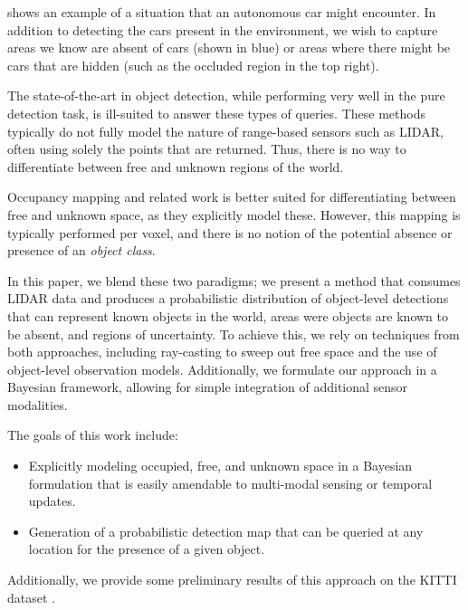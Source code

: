  shows an example of a situation that an autonomous car might
encounter. In addition to detecting the cars present in the environment, we
wish to capture areas we know are absent of cars (shown in blue) or areas where
there might be cars that are hidden (such as the occluded region in the top
right).

The state-of-the-art in object detection, while performing very well in the pure
detection task, is ill-suited to answer these types of queries. These methods
typically do not fully model the nature of range-based sensors such as
\ac{LIDAR}, often using solely the points that are returned. Thus, there is no
way to differentiate between free and unknown regions of the world.

Occupancy mapping and related work is better suited for differentiating between
free and unknown space, as they explicitly model these. However, this mapping is
typically performed per voxel, and there is no notion of the potential absence
or presence of an \emph{object class}.

In this paper, we blend these two paradigms; we present a method that
consumes \ac{LIDAR} data and produces a probabilistic distribution of object-level
detections that can represent known objects in the world, areas were objects are
known to be absent, and regions of uncertainty. To achieve this, we rely on
techniques from both approaches, including ray-casting to sweep out free space
and the use of object-level observation models. Additionally, we formulate our
approach in a Bayesian framework, allowing for simple integration of additional
sensor modalities.

The goals of this work include:
%
\begin{itemize}
  \item Explicitly modeling occupied, free, and unknown space in a Bayesian
    formulation that is easily amendable to multi-modal sensing or temporal
    updates.
  \item Generation of a probabilistic detection map that can be queried at any
    location for the presence of a given object.
\end{itemize}
%
Additionally, we provide some preliminary results of this approach on the KITTI
dataset \cite{Geiger2013IJRR}.
